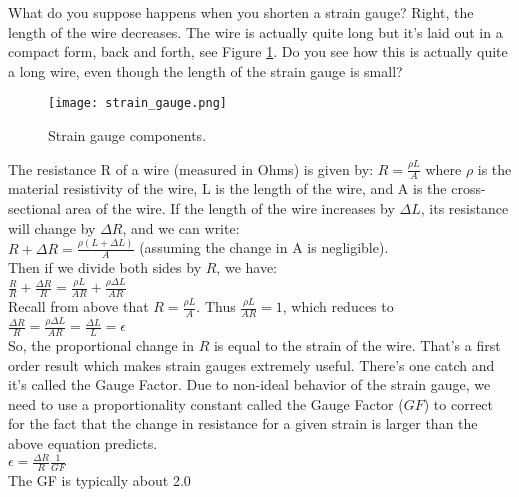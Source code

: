 \documentclass[10pt]{article}
\begin{document}
What do you suppose happens when you shorten a strain gauge?  Right, the length of the wire decreases.  The wire is actually quite long but it’s laid out in a compact form, back and forth, see Figure \ref{fig:str_gauge}. Do you see how this is actually quite a long wire, even though the length of the strain gauge is small?  
\begin{figure}[ht]
	\centering
	\texttt{[image: strain\_gauge.png]}
	\caption{Strain gauge components.}
	\label{fig:str_gauge}
\end{figure}

The resistance R of a wire (measured in Ohms) is given by:  $ R = \frac{\rho L}{A} $ where $ \rho $ is the material resistivity of the wire, L is the length of the wire, and A is the cross-sectional area of the wire.  If the length of the wire increases by $ \Delta L $, its resistance will change by $ \Delta R $, and we can write:
\\

$ R + \Delta R = \frac{\rho (L + \Delta L)}{A} $  (assuming the change in A is negligible).\\

Then if we divide both sides by $ R $, we have: \\

$ \frac{R}{R} + \frac{\Delta R}{R} = \frac{\rho L}{A R} + \frac{\rho \Delta L}{A R}$\\

Recall from above that $ R = \frac{\rho L}{A} $. Thus $ \frac{\rho L}{A R} = 1$, which reduces to \\

$ \frac{\Delta R}{R} = \frac{\rho \Delta L}{A R} = \frac{\Delta L}{L} = \epsilon $ \\

So, the proportional change in $ R $ is equal to the strain of the wire. That’s a first order result which makes strain gauges extremely useful.
There’s one catch and it’s called the Gauge Factor. Due to non-ideal behavior of the strain gauge, we need to use a proportionality constant called the Gauge Factor ($ GF $) to correct for the fact that the change in resistance for a given strain is larger than the above equation predicts.
\\
$ \epsilon = \frac{\Delta R}{R} \frac{1}{GF} $\\

The GF is typically about 2.0\\
\end{document}
